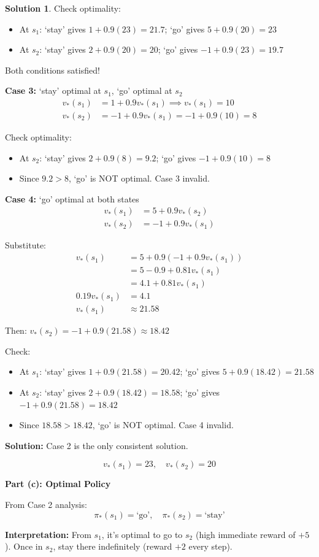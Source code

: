 \documentclass[11pt]{article}
\theoremstyle{definition}
\newtheorem*{solution}{Solution}
\begin{document}
\begin{solution}
Check optimality:
\begin{itemize}
    \item At $s_1$: `stay' gives $1 + 0.9(23) = 21.7$; `go' gives $5 + 0.9(20) = 23$ \checkmark
    \item At $s_2$: `stay' gives $2 + 0.9(20) = 20$; `go' gives $-1 + 0.9(23) = 19.7$ \checkmark
\end{itemize}

Both conditions satisfied!

\textbf{Case 3:} `stay' optimal at $s_1$, `go' optimal at $s_2$
\begin{align*}
v_*(s_1) &= 1 + 0.9 v_*(s_1) \implies v_*(s_1) = 10 \\
v_*(s_2) &= -1 + 0.9 v_*(s_1) = -1 + 0.9(10) = 8
\end{align*}

Check optimality:
\begin{itemize}
    \item At $s_2$: `stay' gives $2 + 0.9(8) = 9.2$; `go' gives $-1 + 0.9(10) = 8$
    \item Since $9.2 > 8$, `go' is NOT optimal. Case 3 invalid.
\end{itemize}

\textbf{Case 4:} `go' optimal at both states
\begin{align*}
v_*(s_1) &= 5 + 0.9 v_*(s_2) \\
v_*(s_2) &= -1 + 0.9 v_*(s_1)
\end{align*}

Substitute:
\begin{align*}
v_*(s_1) &= 5 + 0.9(-1 + 0.9 v_*(s_1)) \\
&= 5 - 0.9 + 0.81 v_*(s_1) \\
&= 4.1 + 0.81 v_*(s_1) \\
0.19 v_*(s_1) &= 4.1 \\
v_*(s_1) &\approx 21.58
\end{align*}

Then: $v_*(s_2) = -1 + 0.9(21.58) \approx 18.42$

Check:
\begin{itemize}
    \item At $s_1$: `stay' gives $1 + 0.9(21.58) = 20.42$; `go' gives $5 + 0.9(18.42) = 21.58$ \checkmark
    \item At $s_2$: `stay' gives $2 + 0.9(18.42) = 18.58$; `go' gives $-1 + 0.9(21.58) = 18.42$
    \item Since $18.58 > 18.42$, `go' is NOT optimal. Case 4 invalid.
\end{itemize}

\textbf{Solution:} Case 2 is the only consistent solution.

\[
\boxed{v_*(s_1) = 23, \quad v_*(s_2) = 20}
\]

\textbf{Part (c): Optimal Policy}

From Case 2 analysis:
\[
\boxed{\pi_*(s_1) = \text{`go'}, \quad \pi_*(s_2) = \text{`stay'}}
\]

\textbf{Interpretation:} From $s_1$, it's optimal to go to $s_2$ (high immediate reward of $+5$). Once in $s_2$, stay there indefinitely (reward $+2$ every step).
\end{solution}
\end{document}
